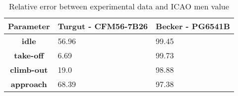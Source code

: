 \begin{table}[h!]
  \centering
  \begin{tabularx}{\textwidth}{||c|X|X||}
  \hline
    \cellcolor{gray!20}\textbf{Parameter} & \cellcolor{gray!20}\textbf{Turgut - CFM56-7B26} & \cellcolor{gray!20}\textbf{Becker - PG6541B} \\ [0.5ex]
  \hline\hline
\centering
    \cellcolor{gray!20}\textbf{idle} & 56.96 & 99.45 \\
  \hline
    \cellcolor{gray!20}\textbf{take-off} & 6.69 & 99.73 \\
  \hline
    \cellcolor{gray!20}\textbf{climb-out} & 19.0 & 98.88 \\
  \hline
    \cellcolor{gray!20}\textbf{approach} & 68.39 & 97.38 \\
  \hline
  \end{tabularx}
  \caption{Relative error between experimental data and ICAO men value}
  \label{tab:relee}
\end{table}
